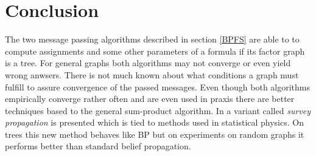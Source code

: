 \section{Conclusion}
The two message passing algorithms described in section \ref{BPFS} are able to to compute assignments and some other parameters of a formula if its factor graph is a tree. For general graphs both algorithms may not converge or even yield wrong anwsers. There is not much known about what conditions a graph must fulfill to assure convergence of the passed messages. \newline
Even though both algorithms empirically converge rather often and are even used in praxis there are better techniques based to the general sum-product algorithm. In \cite{survprob} a variant called \emph{survey propagation} is presented which is tied to methods used in statistical physics. On trees this new method behaves like BP but on experiments on random graphs it performs better than standard belief propagation. 